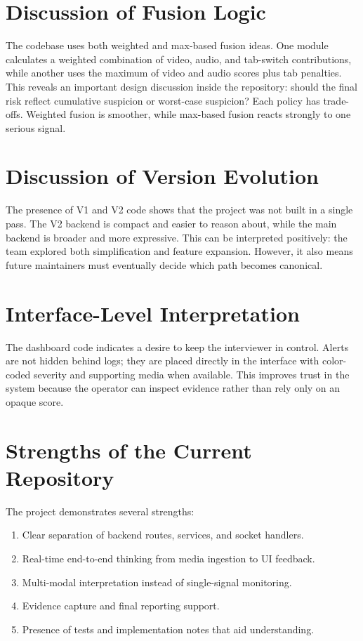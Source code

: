 \documentclass[12pt,a4paper]{extreport}
\begin{document}
\section{Discussion of Fusion Logic}
The codebase uses both weighted and max-based fusion ideas. One module calculates a weighted combination of video, audio, and tab-switch contributions, while another uses the maximum of video and audio scores plus tab penalties. This reveals an important design discussion inside the repository: should the final risk reflect cumulative suspicion or worst-case suspicion? Each policy has trade-offs. Weighted fusion is smoother, while max-based fusion reacts strongly to one serious signal.

\section{Discussion of Version Evolution}
The presence of V1 and V2 code shows that the project was not built in a single pass. The V2 backend is compact and easier to reason about, while the main backend is broader and more expressive. This can be interpreted positively: the team explored both simplification and feature expansion. However, it also means future maintainers must eventually decide which path becomes canonical.

\section{Interface-Level Interpretation}
The dashboard code indicates a desire to keep the interviewer in control. Alerts are not hidden behind logs; they are placed directly in the interface with color-coded severity and supporting media when available. This improves trust in the system because the operator can inspect evidence rather than rely only on an opaque score.

\section{Strengths of the Current Repository}
The project demonstrates several strengths:
\begin{enumerate}
  \item Clear separation of backend routes, services, and socket handlers.
  \item Real-time end-to-end thinking from media ingestion to UI feedback.
  \item Multi-modal interpretation instead of single-signal monitoring.
  \item Evidence capture and final reporting support.
  \item Presence of tests and implementation notes that aid understanding.
\end{enumerate}
\end{document}
